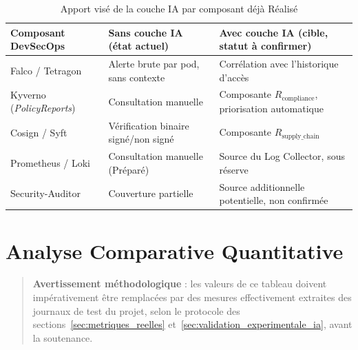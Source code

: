 \begin{table}[htbp]
\centering
\scriptsize
\begin{tabular}{@{}p{2.8cm}p{4.6cm}p{6.6cm}@{}}
\toprule
\textbf{Composant DevSecOps} & \textbf{Sans couche IA (état actuel)} & \textbf{Avec couche IA (cible, statut à confirmer)} \\
\midrule
Falco / Tetragon & Alerte brute par pod, sans contexte & Corrélation avec l'historique d'accès \\
Kyverno (\textit{PolicyReports}) & Consultation manuelle & Composante $R_{\text{compliance}}$, priorisation automatique \\
Cosign / Syft & Vérification binaire signé/non signé & Composante $R_{\text{supply\_chain}}$ \\
Prometheus / Loki & Consultation manuelle (Préparé) & Source du Log Collector, sous réserve \\
Security-Auditor & Couverture partielle & Source additionnelle potentielle, non confirmée \\
\bottomrule
\end{tabular}
\caption{Apport visé de la couche IA par composant déjà Réalisé}
\label{tab:comparaison_par_composant}
\end{table}

\section{Analyse Comparative Quantitative}

\begin{quote}
\textbf{Avertissement méthodologique} : les valeurs de ce tableau doivent impérativement être remplacées par des mesures effectivement extraites des journaux de test du projet, selon le protocole des sections~\ref{sec:metriques_reelles} et~\ref{sec:validation_experimentale_ia}, avant la soutenance.
\end{quote}

